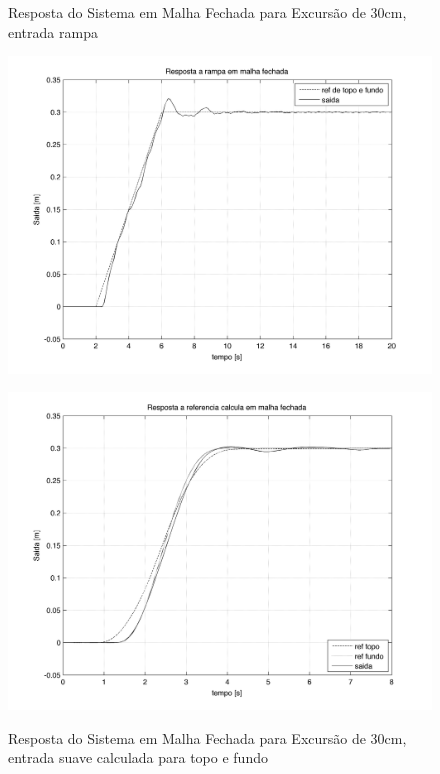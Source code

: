 \begin{figure}[!htb]
    \centering
    \begin{minipage}{.45\textwidth}
        \centering
        \caption{Resposta do Sistema em Malha Fechada para Excursão de 30cm, entrada rampa}
        \includegraphics[width=1\linewidth]{figs/resultados/simulacao/respostaMalhaFechadaRampa}
        \label{respostaMalhaFechadaRampa}
    \end{minipage}%
    \hspace{0.1cm}
    \begin{minipage}{0.45\textwidth}
        \centering
        \caption{Resposta do Sistema em Malha Fechada para Excursão de 30cm, entrada suave calculada para topo e fundo}
        \includegraphics[width=1\linewidth]{figs/resultados/simulacao/respostaMalhaFechadaRefTopoFundo}
        \label{respostaMalhaFechadaRefTopoFundo}
    \end{minipage}
\end{figure}

